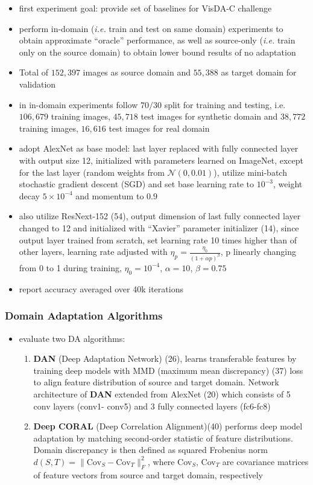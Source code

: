 \begin{itemize}
	\item first experiment goal: provide set of baselines for VisDA-C challenge
	\item perform in-domain (\textit{i.e.} train and test on same domain) experiments to obtain approximate ``oracle'' performance, as well as source-only (\textit{i.e.} train only on the source domain) to obtain lower bound results of no adaptation 
	\item Total of $152,397$ images as source domain and $55,388$ as target domain for validation
	\item in in-domain experiments follow $70/30$ split for training and testing, i.e. $106,679$ training images, $45,718$ test images for synthetic domain and $38,772$ training images, $16,616$ test images for real domain
	\item adopt AlexNet  as base model: last layer replaced with fully connected layer with output size 12, initialized with parameters learned on ImageNet, except for the last layer (random weights from $\mathcal{N}(0, 0.01)$), utilize mini-batch stochastic gradient descent (SGD) and set base learning rate to $10^{-3}$, weight decay $5\times 10^{-4}$ and momentum to $0.9$
	\item also utilize ResNext-152 (54), output dimension of last fully connected layer changed to 12 and initialized with ``Xavier'' parameter initializer (14), since output layer trained from scratch, set learning rate 10 times higher than of other layers, learning rate adjusted with $\eta_p = \frac{\eta_0}{(1+\alpha p)^\beta}$, p linearly changing from 0 to 1 during training, $\eta_0 = 10^{-4}$, $\alpha = 10$, $\beta = 0.75$
	\item report accuracy averaged over 40k iterations
\end{itemize}

\subsubsection{Domain Adaptation Algorithms}
\begin{itemize}
	\item evaluate two DA algorithms:
	\begin{enumerate}
		\item \textbf{DAN} (Deep Adaptation Network) (26), learns transferable features by training deep models with MMD (maximum mean discrepancy) (37) loss to align feature distribution of source and target domain. Network architecture of \textbf{DAN} extended from AlexNet (20) which consists of 5 conv layers (conv1- conv5) and 3 fully connected layers (fc6-fc8)
		\item \textbf{Deep CORAL} (Deep Correlation Alignment)(40) performs deep model adaptation by matching second-order statistic of feature distributions. Domain discrepancy is then defined as squared Frobenius norm $d(S,T) = \lVert \text{Cov}_S - \text{Cov}_T \rVert^2_F$, where Cov$_S$, Cov$_T$ are covariance matrices of feature vectors from source and target domain, respectively
	\end{enumerate}
\end{itemize}

